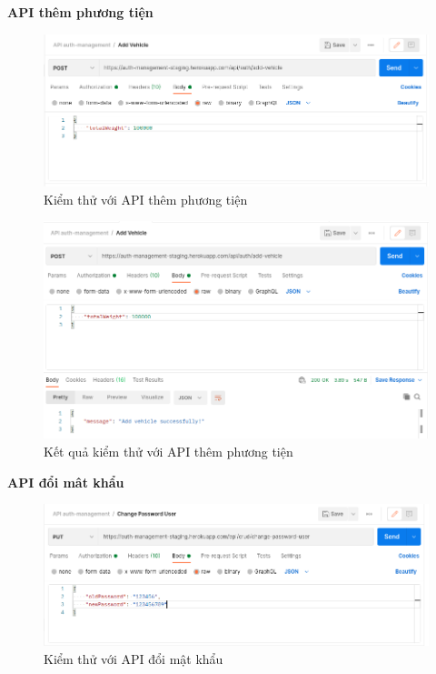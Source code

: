 		\newpage
		\textbf{API thêm phương tiện}
		
		\begin{figure}[H]
			\includegraphics[width=1\textwidth]{Images/testing/API-add-vehicle.png}
			\centering
			\linebreak
			\caption{Kiểm thử với API thêm phương tiện}
		\end{figure}
		
		\begin{figure}[H]
			\includegraphics[width=1\textwidth]{Images/testing/API-add-vehicle-result.png}
			\centering
			\linebreak
			\caption{Kết quả kiểm thử với API thêm phương tiện}
		\end{figure}
		
		\newpage
		\textbf{API đổi mât khẩu}
		
		\begin{figure}[H]
			\includegraphics[width=1\textwidth]{Images/testing/API-change-password.png}
			\centering
			\linebreak
			\caption{Kiểm thử với API đổi mật khẩu}
		\end{figure}
		
